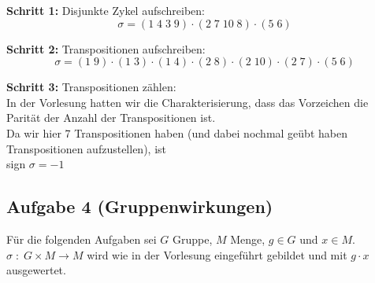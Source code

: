 \documentclass[11pt,a4paper,ngerman]{article}
\begin{document}
\begin{enumerate}[\bfseries a)]
\textbf{Schritt 1:} Disjunkte Zykel aufschreiben:\\
$$
\sigma = \left( 1 \; 4 \; 3 \; 9 \right) \cdot \left( 2 \; 7 \; 10 \; 8 \right) \cdot \left( 5 \; 6 \right)
$$

\textbf{Schritt 2:} Transpositionen aufschreiben:\\
$$
\sigma = ( 1 \; 9 ) \cdot (1 \; 3 ) \cdot ( 1 \; 4 ) \cdot ( 2 \; 8 ) \cdot (2 \; 10 ) \cdot ( 2 \; 7 ) \cdot (5 \; 6 )
$$

\textbf{Schritt 3:} Transpositionen zählen:\\
In der Vorlesung hatten wir die Charakterisierung, dass das Vorzeichen die Parität der Anzahl der Transpositionen ist.\\
Da wir hier 7 Transpositionen haben (und dabei nochmal geübt haben Transpositionen aufzustellen), ist\\
 sign $ \sigma = -1$

\end{enumerate}

\subsection*{Aufgabe 4 \mdseries (Gruppenwirkungen)}

Für die folgenden Aufgaben sei $G$ Gruppe, $M$ Menge, $g \in G$ und $x \in M$.\\
$\sigma \; : \; G \times M \rightarrow M$ wird wie in der Vorlesung eingeführt gebildet und mit $g \cdot x$ ausgewertet.
\end{document}
